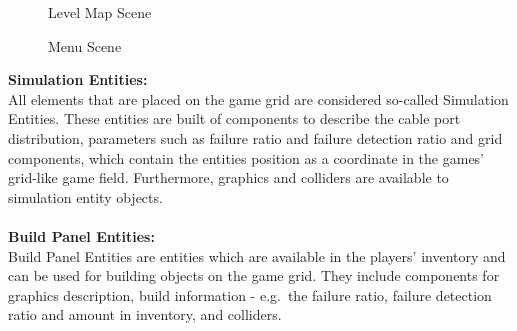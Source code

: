 \begin{figure}
    \centering
    \setlength{\fboxsep}{1pt}
    \setlength{\fboxrule}{1pt}
    \caption{Level Map Scene}
    \label{fig:level-scene}
\end{figure}

\begin{figure}
    \centering
    \setlength{\fboxsep}{1pt}
    \setlength{\fboxrule}{1pt}
    \caption{Menu Scene}
    \label{fig:menu-scene}
\end{figure}

\textbf{Simulation Entities:} \\
All elements that are placed on the game grid are considered so-called Simulation Entities.
These entities are built of components to describe the cable port distribution, parameters such as failure ratio and failure detection ratio and grid components, which contain the
entities position as a coordinate in the games' grid-like game field.
Furthermore, graphics and colliders are available to simulation entity objects.
\\ \\
\textbf{Build Panel Entities:} \\
Build Panel Entities are entities which are available in the players' inventory and can be used for building objects on the game grid.
They include components for graphics description, build information - e.g.\ the failure ratio, failure detection ratio and amount in inventory,
and colliders.

